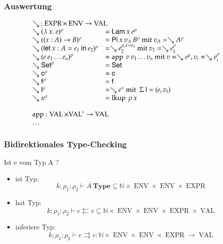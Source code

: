 \documentclass[12pt,red,serif,mathserif]{beamer}
\newcommand{\ves}[1]{{#1}^{\ast}}
\newcommand{\Set}{\mathsf{Set}}
\newcommand{\EPi}[2]{( #1 : #2 ) \rightarrow}
\newcommand{\ELet}[3]{\mathsf{let}\: #1 : #2 = #3 \: \mathsf{in}\:}
\newcommand{\lam}[1]{\lambda\: #1 .\:}
\newcommand{\ra}{\rightarrow}
\newcommand{\spc}{\hspace*{2mm}}
\newcommand{\dd}{\mathsf{l}}
\newcommand{\cc}{\mathsf{c}}
\newcommand{\ff}{\mathsf{f}}
\newcommand{\cN}{\mathbb{N}}
\newcommand{\opn}[1]{\operatorname{#1}}
\newcommand{\Expr}{\opn{EXPR}}
\newcommand{\Val}{\opn{VAL}}
\newcommand{\vlam}{\mathsf{Lam}}
\newcommand{\vpi}{\mathsf{Pi}}
\newcommand{\cl}[2]{#1^{#2}}
\newcommand{\clp}[2]{\cl{(#1)}{#2}}
\newcommand{\Env}{\opn{ENV}}
\newcommand{\wh}{\searrow}
\newcommand{\ap}{\opn{app}}
\newcommand{\lkup}{\opn{lkup}}
\newcommand{\ins}[3]{#1,#2=#3}
\newcommand{\Sig}{\Sigma}
\begin{document}
\frame
{
  \frametitle{Auswertung}

\[
\begin{array}{ll}
\multicolumn{2}{l}{\wh \: : \Expr \times \Env \ra \Val}\\
\wh \clp{\lam{x}{e}}{\rho} & = \vlam \: x \: \cl{e}{\rho} \\
\wh \clp{\EPi{x}{A}{B}}{\rho} &= \vpi \: x \: v_A \: \cl{B}{\rho} \mbox{ mit } v_A = \wh \cl{A}{\rho} \\
\wh \clp{\ELet{x}{A}{e_1}{e_2}}{\rho} &= \wh \cl{e_2}{\ins{\rho}{x}{v_1}} \mbox { mit } v_1 = \wh \cl{e_1}{\rho} \\
\wh \clp{e \: e_1 \ldots e_n}{\rho} &= \ap \: v \: v_1 \ldots v_n \mbox{ mit } v = \wh \cl{e}{\rho} , v_i = \wh \cl{e_i}{\rho}\\
\wh \cl{\Set}{\rho} & = \Set \\ 
\wh \cl{\cc}{\rho} & = \cc  \\
\wh \cl{\ff}{\rho} & = \ff \\
\wh \cl{\dd}{\rho} & = \wh \cl{e}{\diamond} \mbox{ mit } \: \Sig \: \dd = (e,v_t)\\
\wh \cl{x}{\rho} & = \lkup \: \rho \: x \\
\spc\\
\multicolumn{2}{l}{\ap : \Val \times \ves{\Val} \ra \Val}\\
\ldots\\
\end{array}
\]
}

\renewcommand\Check[5]{#1;#2;#3\vdash#4\leftleftarrows#5}
\newcommand\IsType[4]{#1;#2;#3\vdash#4\:\mathbf{Type}}
\newcommand\DataType[5]{#1;#2;#3;#4\vdash#5\:\mathbf{DataType}}
\newcommand\ConType[5]{#1;#2;#3;#4\vdash#5\:\mathbf{ConType}}
\newcommand\Infer[5]{#1;#2;#3\vdash#4\rightrightarrows#5}
\newcommand\EqVal[4]{#1;#2\vdash#3\Leftrightarrow#4}
\newcommand\FeqVal[4]{#1;#2\vdash#3{\:\leftrightarrow\:}#4}
\newcommand\DeqVal[2]{\vdash#1\leftrightarrow#2}
\newcommand\LeqVal[4]{#1;#2;\vdash#3\:\leqq\:#4}
\newcommand\FleqVal[4]{#1;#2\vdash#3{\:\ll\:}#4}
\newcommand\DLeqVal[2]{\vdash#1\leq#2}
\newcommand\SzLeq[2]{\vdash#1\sqsubseteq#2}

\frame
{
  \frametitle{Bidirektionales Type-Checking}

Ist e vom Typ A ? 
\vspace*{0.2cm}
\begin{itemize}
\item
ist Typ: \[\IsType{k}{\rho_1}{\rho_2}{A} \subseteq \cN \times \Env \times \Env \times \Expr \]
\item
hat Typ: \[\Check{k}{\rho_1}{\rho_2}{e}{v} \subseteq \cN \times \Env \times \Env \times \Expr \times \Val\]
\item
inferiere Typ: \[\Infer{k}{\rho_1}{\rho_2}{e}{v} : \cN \times \Env \times \Env \times \Expr \ra \Val\]

\end{itemize}
}
\end{document}
